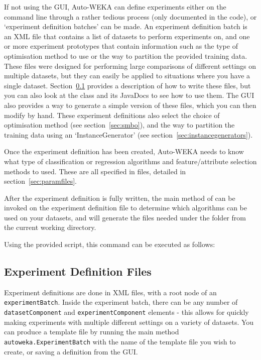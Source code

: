  
If not using the GUI, Auto-WEKA can define experiments either on the command line through a rather tedious process (only documented in the code), or `experiment definition batches' can be made. An experiment definition batch is an XML file that contains a list of datasets to perform experiments on, and one or more experiment prototypes that contain information such as the type of optimisation method to use or the way to partition the provided training data. These files were designed for performing large comparisons of different settings on multiple datasets, but they can easily be applied to situations where you have a single dataset. Section~\ref{sec:experimentdefs} provides a description of how to write these files, but you can also look at the  class and its JavaDocs to see how to use them. The GUI also provides a way to generate a simple version of these files, which you can then modify by hand. These experiment definitions also select the choice of optimisation method (see section~\ref{sec:smbo}), and the way to partition the training data using an `InstanceGenerator' (see section~\ref{sec:instancegenerators}).

Once the experiment definition has been created, Auto-WEKA needs to know what type of classification or regression algorithms and feature/attribute selection methods to used. These are all specified in  files, detailed in section~\ref{sec:paramfiles}.

After the experiment definition is fully written, the main method of  can be invoked on the experiment definition file to determine which algorithms can be used on your datasets, and will generate the files needed under the  folder from the current working directory. 

\begin{aside}
  Using the provided script, this command can be executed as follows: \\
\end{aside}


\subsection{Experiment Definition Files}\label{sec:experimentdefs}

Experiment definitions are done in XML files, with a root node of an \texttt{experimentBatch}. Inside the experiment batch, there can be any number of \texttt{datasetComponent} and \texttt{experimentComponent} elements - this allows for quickly making experiments with multiple different settings on a variety of datasets. You can produce a template file by running the main method \texttt{autoweka.ExperimentBatch} with the name of the template file you wish to create, or saving a definition from the GUI.

